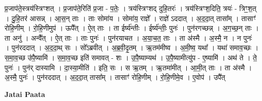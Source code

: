 \documentclass[17pt]{extarticle}
\begin{document}
प्र॒जाप॑ते॒स्त्रय॑स्त्रिꣳशत् । प्र॒जाप॑ते॒रिति॑ प्र॒जा - प॒तेः॒ । त्रय॑स्त्रिꣳशद् दुहि॒तरः॑ । त्रय॑स्त्रिꣳश॒दिति॒ त्रयः॑ - त्रिꣳ॒॒श॒त् । दु॒हि॒तर॑ आसन्न् । आ॒स॒न् ताः । ताः सोमा॑य । सोमा॑य॒ राज्ञे᳚ । राज्ञे॑ ऽददात् । अ॒द॒दा॒त् तासा᳚म् । तासाꣳ॑ रोहि॒णीम् । रो॒हि॒णीमुप॑ । ऊपै᳚त् । ऐ॒त् ताः । ता ईर्ष्य॑न्तीः । ईर्ष्य॑न्तीः॒ पुनः॑ । पुन॑रगच्छन्न् । अ॒ग॒च्छ॒न् ताः । ता अनु॑ । अन्वै᳚त् । ऐ॒त् ताः । ताः पुनः॑ । पुन॑रयाचत । अ॒या॒च॒त॒ ताः । ता अ॑स्मै । अ॒स्मै॒ न । न पुनः॑ । पुन॑रददात् । अ॒द॒दा॒थ् सः । सो᳚ऽब्रवीत् । अ॒ब्र॒वी॒दृ॒तम् । ऋ॒तम॑मीष्व । अ॒मी॒ष्व॒ यथा᳚ । यथा॑ समाव॒च्छः । स॒मा॒व॒च्छ उ॑पै॒ष्यामि॑ । स॒मा॒व॒च्छ इति॑ समावत् - शः । उ॒पै॒ष्याम्यथ॑ । उ॒पै॒ष्यामीत्यु॑प - ए॒ष्यामि॑ । अथ॑ ते । ते॒ पुनः॑ । पुन॑र् दास्यामि । दा॒स्या॒मीति॑ । इति॒ सः । स ऋ॒तम् । ऋ॒तमा॑मीत् । आ॒मी॒त् ताः । ता अ॑स्मै । अ॒स्मै॒ पुनः॑ । पुन॑रददात् । अ॒द॒दा॒त् तासा᳚म् । तासाꣳ॑ रोहि॒णीम् । रो॒हि॒णीमे॒व । 
ए॒वोप॑ । उपै᳚त् \newline

\textbf{Jatai Paata} \newline
\end{document}
